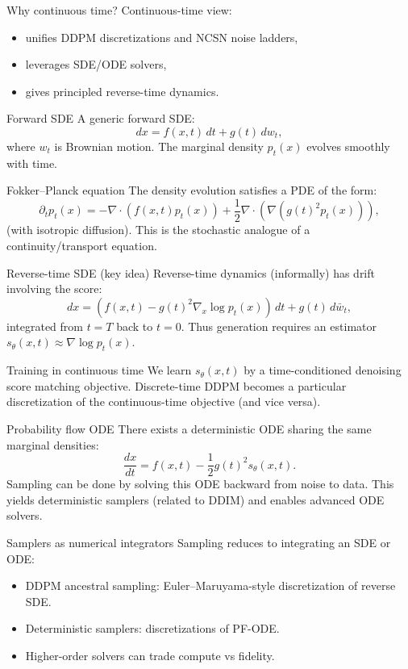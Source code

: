 \documentclass[aspectratio=169]{beamer}
\begin{document}
\begin{frame}{Why continuous time?}
Continuous-time view:
\begin{itemize}
\item unifies DDPM discretizations and NCSN noise ladders,
\item leverages SDE/ODE solvers,
\item gives principled reverse-time dynamics.
\end{itemize}
\end{frame}

\begin{frame}{Forward SDE}
A generic forward SDE:
\[
dx = f(x,t)\,dt + g(t)\,dw_t,
\]
where \(w_t\) is Brownian motion.
The marginal density \(p_t(x)\) evolves smoothly with time.
\end{frame}

\begin{frame}{Fokker--Planck equation}
The density evolution satisfies a PDE of the form:
\[
\partial_t p_t(x)= -\nabla\cdot(f(x,t)p_t(x))+\frac12\nabla\cdot\left(\nabla(g(t)^2 p_t(x))\right),
\]
(with isotropic diffusion).
This is the stochastic analogue of a continuity/transport equation.
\end{frame}

\begin{frame}{Reverse-time SDE (key idea)}
Reverse-time dynamics (informally) has drift involving the score:
\[
dx = \left(f(x,t)-g(t)^2 \nabla_x\log p_t(x)\right)\,dt + g(t)\,d\bar w_t,
\]
integrated from \(t=T\) back to \(t=0\).
Thus generation requires an estimator \(s_\theta(x,t)\approx \nabla\log p_t(x)\).
\end{frame}

\begin{frame}{Training in continuous time}
We learn \(s_\theta(x,t)\) by a time-conditioned denoising score matching objective.
Discrete-time DDPM becomes a particular discretization of the continuous-time objective (and vice versa).
\end{frame}

\begin{frame}{Probability flow ODE}
There exists a deterministic ODE sharing the same marginal densities:
\[
\frac{dx}{dt} = f(x,t)-\frac12 g(t)^2 s_\theta(x,t).
\]
Sampling can be done by solving this ODE backward from noise to data.
This yields deterministic samplers (related to DDIM) and enables advanced ODE solvers.
\end{frame}

\begin{frame}{Samplers as numerical integrators}
Sampling reduces to integrating an SDE or ODE:
\begin{itemize}
\item DDPM ancestral sampling: Euler--Maruyama-style discretization of reverse SDE.
\item Deterministic samplers: discretizations of PF-ODE.
\item Higher-order solvers can trade compute vs fidelity.
\end{itemize}
\end{frame}
\end{document}
